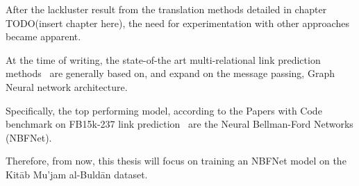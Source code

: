 After the lackluster result from the translation methods detailed in chapter TODO(insert chapter here), the need for
experimentation with other approaches became apparent.

At the time of writing, the state-of-the art multi-relational link prediction methods~\cite{LPSOTA} are generally
based on, and expand on the message passing, Graph Neural network architecture.

Specifically, the top performing model, according to the Papers with Code benchmark on FB15k-237 link prediction~\cite{NBFNetSota}
are the Neural Bellman-Ford Networks (NBFNet).

Therefore, from now, this thesis will focus on training an NBFNet model on the Kitāb Mu'jam al-Buldān dataset.

